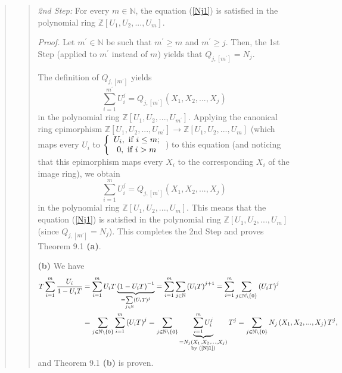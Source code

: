 \documentclass[12pt,final,notitlepage,onecolumn,german]{article}%
\begin{document}
\begin{quote}
\begin{quote}
\textit{2nd Step:} For every $m\in\mathbb{N}$, the equation (\ref{Nj1}) is
satisfied in the polynomial ring $\mathbb{Z}\left[  U_{1},U_{2},...,U_{m}%
\right]  $.

\textit{Proof.} Let $m^{\prime}\in\mathbb{N}$ be such that $m^{\prime}\geq m$
and $m^{\prime}\geq j$. Then, the 1st Step (applied to $m^{\prime}$ instead of
$m$) yields that $Q_{j,\left[  m^{\prime}\right]  }=N_{j}.$

The definition of $Q_{j,\left[  m^{\prime}\right]  }$ yields
\[
\sum_{i=1}^{m^{\prime}}U_{i}^{j}=Q_{j,\left[  m^{\prime}\right]  }\left(
X_{1},X_{2},...,X_{j}\right)
\]
in the polynomial ring $\mathbb{Z}\left[  U_{1},U_{2},...,U_{m^{\prime}%
}\right]  $. Applying the canonical ring epimorphism $\mathbb{Z}\left[
U_{1},U_{2},...,U_{m^{\prime}}\right]  \rightarrow\mathbb{Z}\left[
U_{1},U_{2},...,U_{m}\right]  $ (which maps every $U_{i}$ to $\left\{
\begin{array}
[c]{c}%
U_{i},\text{ if }i\leq m;\\
0,\text{ if }i>m
\end{array}
\right.  $) to this equation (and noticing that this epimorphism maps every
$X_{i}$ to the corresponding $X_{i}$ of the image ring), we obtain%
\[
\sum_{i=1}^{m}U_{i}^{j}=Q_{j,\left[  m^{\prime}\right]  }\left(  X_{1}%
,X_{2},...,X_{j}\right)
\]
in the polynomial ring $\mathbb{Z}\left[  U_{1},U_{2},...,U_{m}\right]  .$
This means that the equation (\ref{Nj1}) is satisfied in the polynomial ring
$\mathbb{Z}\left[  U_{1},U_{2},...,U_{m}\right]  $ (since $Q_{j,\left[
m^{\prime}\right]  }=N_{j}$). This completes the 2nd Step and proves Theorem
9.1 \textbf{(a)}.

\textbf{(b)} We have%
\begin{align*}
T\sum_{i=1}^{m}\dfrac{U_{i}}{1-U_{i}T}  &  =\sum_{i=1}^{m}U_{i}T\underbrace
{\left(  1-U_{i}T\right)  ^{-1}}_{=\sum\limits_{j\in\mathbb{N}}\left(
U_{i}T\right)  ^{j}}=\sum_{i=1}^{m}\sum_{j\in\mathbb{N}}\left(  U_{i}T\right)
^{j+1}=\sum_{i=1}^{m}\sum_{j\in\mathbb{N}\setminus\left\{  0\right\}  }\left(
U_{i}T\right)  ^{j}\\
&  =\sum_{j\in\mathbb{N}\setminus\left\{  0\right\}  }\sum_{i=1}^{m}\left(
U_{i}T\right)  ^{j}=\sum_{j\in\mathbb{N}\setminus\left\{  0\right\}
}\underbrace{\sum_{i=1}^{m}U_{i}^{j}}_{\substack{=N_{j}\left(  X_{1}%
,X_{2},...,X_{j}\right)  \\\text{by (\ref{Nj1})}}}T^{j}=\sum_{j\in
\mathbb{N}\setminus\left\{  0\right\}  }N_{j}\left(  X_{1},X_{2}%
,...,X_{j}\right)  T^{j},
\end{align*}
and Theorem 9.1 \textbf{(b)} is proven.


\end{quote}
\end{quote}
\end{document}
